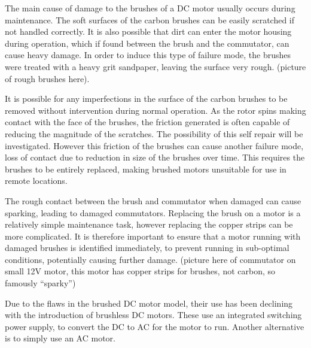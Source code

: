 The main cause of damage to the brushes of a DC motor usually occurs during maintenance. The soft surfaces of the carbon brushes can be easily scratched if not handled correctly. It is also possible that dirt can enter the motor housing during operation, which if found between the brush and the commutator, can cause heavy damage. In order to induce this type of failure mode, the brushes were treated with a heavy grit sandpaper, leaving the surface very rough. (picture of rough brushes here). 

It is possible for any imperfections in the surface of the carbon brushes to be removed without intervention during normal operation. As the rotor spins making contact with the face of the brushes, the friction generated is often capable of reducing the magnitude of the scratches. The possibility of this self repair will be investigated. However this friction of the brushes can cause another failure mode, loss of contact due to reduction in size of the brushes over time. This requires the brushes to be entirely replaced, making brushed motors unsuitable for use in remote locations. %

The rough contact between the brush and commutator when damaged can cause sparking, leading to damaged commutators. Replacing the brush on a motor is a relatively simple maintenance task, however replacing the copper strips can be more complicated. It is therefore important to ensure that a motor running with damaged brushes is identified immediately, to prevent running in sub-optimal conditions, potentially causing further damage. (picture here of commutator on small 12V motor, this motor has copper strips for brushes, not carbon, so famously “sparky”)

Due to the flaws in the brushed DC motor model, their use has been declining with the introduction of brushless DC motors. These use an integrated switching power supply, to convert the DC to AC for the motor to run. Another alternative is to simply use an AC motor. 

